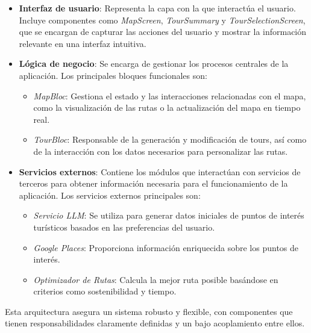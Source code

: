 \begin{itemize}
	\item \textbf{Interfaz de usuario}: Representa la capa con la que interactúa el usuario. Incluye componentes como \textit{MapScreen}, \textit{TourSummary} y \textit{TourSelectionScreen}, que se encargan de capturar las acciones del usuario y mostrar la información relevante en una interfaz intuitiva.
	
	\item \textbf{Lógica de negocio}: Se encarga de gestionar los procesos centrales de la aplicación. Los principales bloques funcionales son:
	\begin{itemize}
		\item \textit{MapBloc}: Gestiona el estado y las interacciones relacionadas con el mapa, como la visualización de las rutas o la actualización del mapa en tiempo real.
		\item \textit{TourBloc}: Responsable de la generación y modificación de tours, así como de la interacción con los datos necesarios para personalizar las rutas.
	\end{itemize}
	
	\item \textbf{Servicios externos}: Contiene los módulos que interactúan con servicios de terceros para obtener información necesaria para el funcionamiento de la aplicación. Los servicios externos principales son:
	\begin{itemize}
		\item \textit{Servicio LLM}: Se utiliza para generar datos iniciales de puntos de interés turísticos basados en las preferencias del usuario.
		\item \textit{Google Places}: Proporciona información enriquecida sobre los puntos de interés.
		\item \textit{Optimizador de Rutas}: Calcula la mejor ruta posible basándose en criterios como sostenibilidad y tiempo.
	\end{itemize}
\end{itemize}

Esta arquitectura asegura un sistema robusto y flexible, con componentes que tienen responsabilidades claramente definidas y un bajo acoplamiento entre ellos.





